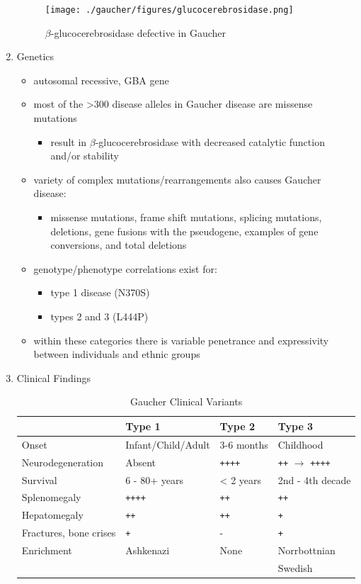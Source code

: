 \documentclass{scrartcl}
\begin{document}
\begin{enumerate}
\begin{figure}[htbp]
\centering
\texttt{[image: ./gaucher/figures/glucocerebrosidase.png]}
\caption{\label{fig:org6a0c837}
\(\beta\)-glucocerebrosidase defective in Gaucher}
\end{figure}

\item Genetics
\label{sec:org01d07b2}
\begin{itemize}
\item autosomal recessive, GBA gene
\item most of the >300 disease alleles in Gaucher disease are missense
mutations
\begin{itemize}
\item result in \(\beta\)-glucocerebrosidase with decreased catalytic
function and/or stability
\end{itemize}
\item variety of complex mutations/rearrangements also causes Gaucher
disease:
\begin{itemize}
\item missense mutations, frame shift mutations, splicing mutations,
deletions, gene fusions with the pseudogene, examples of gene
conversions, and total deletions
\end{itemize}
\item genotype/phenotype correlations exist for:
\begin{itemize}
\item type 1 disease (N370S)
\item types 2 and 3 (L444P)
\end{itemize}
\item within these categories there is variable penetrance and
expressivity between individuals and ethnic groups
\end{itemize}

\item Clinical Findings
\label{sec:org743e572}
\begin{table}[htbp]
\caption{\label{tab:orgd4ea5f4}
Gaucher Clinical Variants}
\centering
\begin{tabular}{llll}
 & Type 1 & Type 2 & Type 3\\
\hline
Onset & Infant/Child/Adult & 3-6 months & Childhood\\
Neurodegeneration & Absent & \texttt{++++} & \texttt{++} \(\to\) \texttt{++++}\\
Survival & 6 - 80+ years & < 2 years & 2nd - 4th decade\\
Splenomegaly & \texttt{++++} & \texttt{++} & \texttt{++}\\
Hepatomegaly & \texttt{++} & \texttt{++} & \texttt{+}\\
Fractures, bone crises & \texttt{+} & - & \texttt{+}\\
Enrichment & Ashkenazi & None & Norrbottnian\\
 &  &  & Swedish\\
\end{tabular}
\end{table}


\end{enumerate}
\end{document}
